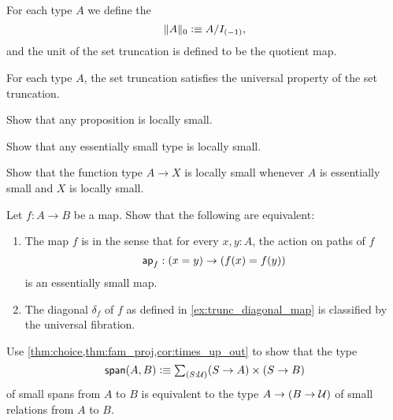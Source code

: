 \begin{defn}
For each type $A$ we define the 
\begin{equation*}
\trunc{0}{A}\defeq A/I_{(-1)},
\end{equation*}
and the unit of the set truncation is defined to be the quotient map.
\end{defn}

\begin{thm}
For each type $A$, the set truncation satisfies the universal property of the set truncation.
\end{thm}

\begin{exercises}
\exercise
\begin{subexenum}
\item Show that any proposition is locally small.
\item Show that any essentially small type is locally small.
\item Show that the function type $A\to X$ is locally small whenever $A$ is essentially small and $X$ is locally small.
\end{subexenum}
\exercise Let $f:A\to B$ be a map. Show that the following are equivalent:
\begin{enumerate}
\item The map $f$ is  in the sense that for every $x,y:A$, the action on paths of $f$
\begin{equation*}
\apfunc{f}:(x=y)\to (f(x)=f(y))
\end{equation*}
is an essentially small map.
\item The diagonal $\delta_f$ of $f$ as defined in \cref{ex:trunc_diagonal_map} is classified by the universal fibration.
\end{enumerate}
\exercise \label{ex:span_rel}Use \cref{thm:choice,thm:fam_proj,cor:times_up_out} to show that the type 
\begin{equation*}
\mathsf{span}(A,B)\defeq \sm{S:\UU} (S\to A)\times (S\to B)
\end{equation*}
of small spans from $A$ to $B$ is equivalent to the type $A\to (B\to\UU)$ of small relations from $A$ to $B$.
\end{exercises}
